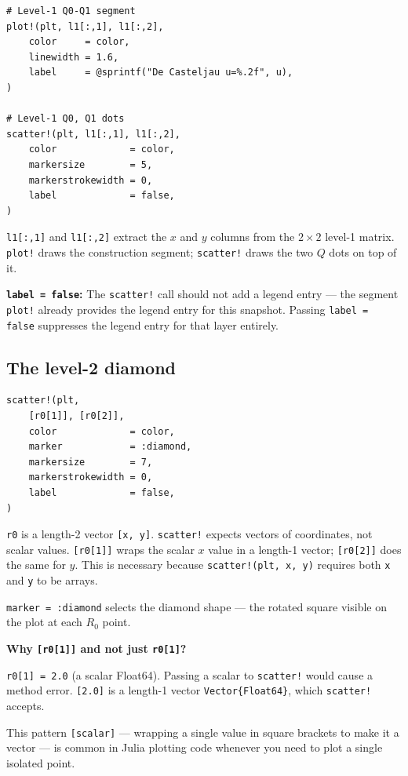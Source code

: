 \documentclass[12pt, a4paper]{article}
\newcommand{\cd}[1]{\texttt{#1}}
\begin{document}
\begin{verbatim}
# Level-1 Q0-Q1 segment
plot!(plt, l1[:,1], l1[:,2],
    color     = color,
    linewidth = 1.6,
    label     = @sprintf("De Casteljau u=%.2f", u),
)

# Level-1 Q0, Q1 dots
scatter!(plt, l1[:,1], l1[:,2],
    color             = color,
    markersize        = 5,
    markerstrokewidth = 0,
    label             = false,
)
\end{verbatim}

\cd{l1[:,1]} and \cd{l1[:,2]} extract the $x$ and $y$
columns from the $2 \times 2$ level-1 matrix.
\cd{plot!} draws the construction segment; \cd{scatter!}
draws the two $Q$ dots on top of it.

\textbf{\cd{label = false}:}
The \cd{scatter!} call should not add a legend entry ---
the segment \cd{plot!} already provides the legend entry
for this snapshot.
Passing \cd{label = false} suppresses the legend entry
for that layer entirely.

\subsection{The level-2 diamond}

\begin{verbatim}
scatter!(plt,
    [r0[1]], [r0[2]],
    color             = color,
    marker            = :diamond,
    markersize        = 7,
    markerstrokewidth = 0,
    label             = false,
)
\end{verbatim}

\cd{r0} is a length-2 vector \cd{[x, y]}.
\cd{scatter!} expects vectors of coordinates, not scalar
values.
\cd{[r0[1]]} wraps the scalar $x$ value in a
length-1 vector; \cd{[r0[2]]} does the same for $y$.
This is necessary because \cd{scatter!(plt, x, y)}
requires both \cd{x} and \cd{y} to be arrays.

\cd{marker = :diamond} selects the diamond shape ---
the rotated square visible on the plot at each $R_0$ point.

\begin{examplebox}
\textbf{Why \cd{[r0[1]]} and not just \cd{r0[1]}?}

\cd{r0[1] = 2.0} (a scalar Float64).
Passing a scalar to \cd{scatter!} would cause a method
error.
\cd{[2.0]} is a length-1 vector \cd{Vector\{Float64\}},
which \cd{scatter!} accepts.

This pattern \cd{[scalar]} --- wrapping a single value
in square brackets to make it a vector --- is common in
Julia plotting code whenever you need to plot a single
isolated point.
\end{examplebox}
\end{document}
